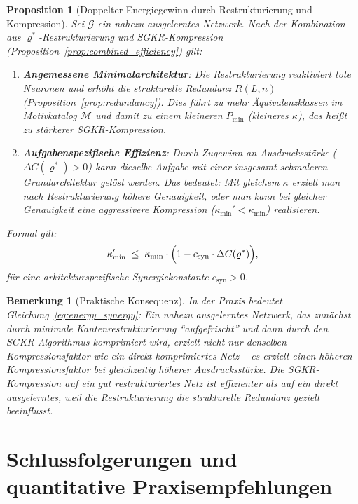 \documentclass[12pt, a4paper, openany]{report}
\newtheorem{proposition}[theorem]{Proposition}
\newtheorem{remark}[theorem]{Bemerkung}
\newcommand{\calG}{\mathcal{G}}
\newcommand{\calM}{\mathcal{M}}
\begin{document}
\begin{proposition}[Doppelter Energiegewinn durch Restrukturierung und Kompression]
\label{prop:energy_synergy}
Sei $\calG$ ein nahezu ausgelerntes Netzwerk.  Nach der Kombination aus
$\varrho^*$-Restrukturierung und SGKR-Kompression
(Proposition~\ref{prop:combined_efficiency}) gilt:
\begin{enumerate}[label=(\roman*)]
  \item \textbf{Angemessene Minimalarchitektur}: Die Restrukturierung
    reaktiviert tote Neuronen und erhöht die strukturelle Redundanz $R(L,n)$
    (Proposition~\ref{prop:redundancy}).  Dies führt zu mehr
    Äquivalenzklassen im Motivkatalog $\calM$ und damit zu einem
    kleineren $P_{\min}$ (kleineres $\kappa$), das heißt zu
    \emph{stärkerer SGKR-Kompression}.
  \item \textbf{Aufgabenspezifische Effizienz}: Durch Zugewinn an
    Ausdrucksstärke ($\Delta C(\varrho^*) > 0$) kann dieselbe Aufgabe mit
    einer insgesamt schmaleren Grundarchitektur gelöst werden.  Das bedeutet:
    Mit gleichem $\kappa$ erzielt man nach Restrukturierung höhere
    Genauigkeit, oder man kann bei gleicher Genauigkeit eine aggressivere
    Kompression ($\kappa_{\min}' < \kappa_{\min}$) realisieren.
\end{enumerate}
Formal gilt:
\begin{equation}
  \label{eq:energy_synergy}
  \kappa'_{\min}
  \;\leq\;
  \kappa_{\min} \cdot
  \Bigl(1 - c_{\mathrm{syn}} \cdot \Delta C(\varrho^*)\Bigr),
\end{equation}
für eine arkitekturspezifische Synergiekonstante $c_{\mathrm{syn}} > 0$.
\end{proposition}

\begin{remark}[Praktische Konsequenz]
\label{rem:practical_energy}
In der Praxis bedeutet Gleichung~\eqref{eq:energy_synergy}: Ein nahezu
ausgelerntes Netzwerk, das zunächst durch minimale Kantenrestrukturierung
``aufgefrischt'' und dann durch den SGKR-Algorithmus komprimiert wird,
erzielt nicht nur denselben Kompressionsfaktor wie ein direkt komprimiertes
Netz -- es erzielt einen \emph{höheren} Kompressionsfaktor bei
gleichzeitig \emph{höherer} Ausdrucksstärke.  Die SGKR-Kompression auf ein
gut restrukturiertes Netz ist effizienter als auf ein direkt ausgelerntes,
weil die Restrukturierung die strukturelle Redundanz gezielt beeinflusst.
\end{remark}

\section{Schlussfolgerungen und quantitative Praxisempfehlungen}
\label{sec:energy_conclusions}
\end{document}
